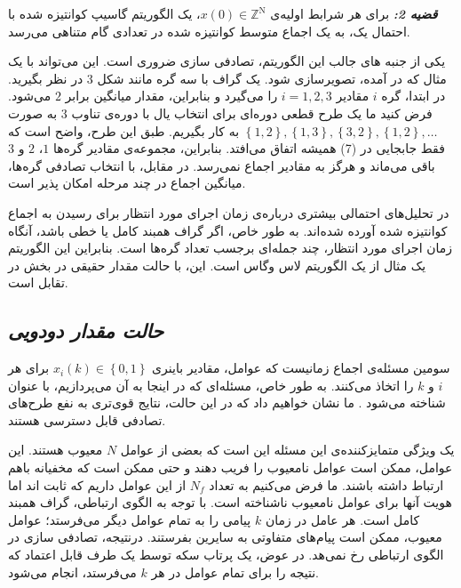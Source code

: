 \documentclass[12pt]{article} %
\begin{document}
		\textit{\textbf{قضیه 2:}}
		برای هر شرابط اولیه‌ی 
		$x(0)\in \mathbb{Z}^{\mathrm{N}}$، 
		یک الگوریتم گاسیپ کوانتیزه شده با احتمال یک، به یک اجماع متوسط کوانتیزه شده در تعدادی گام متناهی می‌رسد.
		
		یکی از جنبه های جالب این الگوریتم، تصادفی سازی ضروری است. این می‌تواند با یک مثال که در 
		\cite{bib13} 
		آمده، تصویرسازی شود. 
		یک گراف با سه گره مانند شکل 3 در نظر بگیرید. در ابتدا، گره 
		$i$ 
		مقادیر 
		$i = 1, 2, 3$ 
		را می‌گیرد و بنابراین، مقدار میانگین برابر $2$ می‌شود.
		فرض کنید ما یک طرح قطعی دوره‌ای برای انتخاب یال با دوره‌ی تناوب 
		$3$ 
		به صورت 
		$\left\{ 1, 2 \right\}, \left\{ 1, 3 \right\}, \left\{ 3, 2 \right\}, \left\{ 1, 2 \right\}, \ldots$ 
		به کار بگیریم. طبق این طرح، واضح است که فقط جابجایی در (7) همیشه اتفاق می‌افتد. بنابراین، مجموعه‌ی مقادیر گره‌ها 
		$1$، 
		$2$ 
		و
		$3$ 
		باقی می‌ماند و هرگز به مقادیر اجماع نمی‌رسد. در مقابل، با انتخاب تصادفی گره‌ها، میانگین اجماع در چند مرحله امکان پذیر است.
		
		در 
		\cite{bib13} 
		تحلیل‌های احتمالی بیشتری درباره‌ی زمان اجرای مورد انتظار برای رسیدن به اجماع کوانتیزه شده آورده شده‌اند. به طور خاص، اگر گراف همبند کامل یا خطی باشد، آنگاه زمان اجرای مورد انتظار، چند جمله‌ای برجسب تعداد گره‌ها است. بنابراین این الگوریتم یک مثال از یک الگوریتم لاس وگاس است. این، با حالت مقدار حقیقی در بخش 
		در تقابل است.
		
		\subsection{\textit{حالت مقدار دودویی}}
		
		سومین مسئله‌ی اجماع زمانیست که عوامل، مقادیر باینری 
		$x_{i}(k) \in \left\{ 0,1 \right\}$ 
		برای هر 
		$i$ 
		و 
		$k$ 
		را اتخاذ می‌کنند. به طور خاص، مسئله‌ای که در اینجا به آن می‌پردازیم، با عنوان 
		شناخته می‌شود 
		\cite{bib17}. 
		ما نشان خواهیم داد که در این حالت، نتایج قوی‌تری به نفع طرح‌های تصادفی قابل دسترسی هستند.
	
	یک ویژگی متمایزکننده‌ی این مسئله این است که بعضی از عوامل 
	$N$ 
	معیوب هستند. این عوامل، ممکن است عوامل نامعیوب را فریب دهند و حتی ممکن است که مخفیانه باهم ارتباط داشته باشند. ما فرض می‌کنیم به تعداد 
	$N_{f}$ 
از این عوامل داریم که ثابت اند اما هویت آنها برای عوامل نامعیوب ناشناخته است. با توجه به الگوی ارتباطی، گراف همبند کامل است. هر عامل در زمان 
$k$ 
پیامی را به تمام عوامل دیگر می‌فرستد؛ عوامل معیوب، ممکن است پیام‌های متفاوتی به سایرین بفرستند. درنتیجه، تصادفی سازی در الگوی ارتباطی رخ نمی‌هد. در عوض، یک پرتاب سکه توسط یک طرف قابل اعتماد که نتیجه را برای تمام عوامل در هر 
$k$ 
می‌فرستد، انجام می‌شود.
\end{document}
